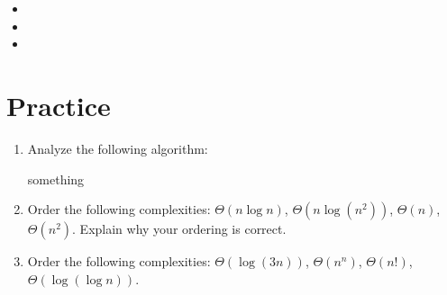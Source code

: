 \documentclass[main.tex]{subfiles}
\begin{document}
\begin{itemize}
	\item 
	\item 
	\item 
\end{itemize}

\section{Practice}

\begin{enumerate}
	\item Analyze the following algorithm:
	\begin{algorithmic}[1]
			\State something
		\EndFunction
	\end{algorithmic}
	\item Order the following complexities: \(\Theta(n \log n)\), \(\Theta(n \log (n^2))\), \(\Theta(n)\), \(\Theta(n^2)\). Explain why your ordering is correct.
	\item Order the following complexities: \(\Theta(\log (3n))\), \(\Theta(n^n)\), \(\Theta(n!)\), \(\Theta(\log (\log n))\).
\end{enumerate}

%
\end{document}
